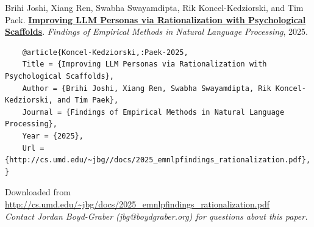 \documentclass[a4paper]{article}
\begin{document}
    Brihi Joshi, Xiang Ren, Swabha Swayamdipta, Rik Koncel-Kedziorski, and Tim Paek.  {\bf \href{http://cs.umd.edu/~jbg//docs/2025_emnlpfindings_rationalization.pdf}{Improving LLM Personas via Rationalization with Psychological Scaffolds}}.  \emph{Findings of Empirical Methods in Natural Language Processing}, 2025.



    \vspace{5cm}

    \begin{verbatim}
    @article{Koncel-Kedziorski,:Paek-2025,
	Title = {Improving LLM Personas via Rationalization with Psychological Scaffolds},
	Author = {Brihi Joshi, Xiang Ren, Swabha Swayamdipta, Rik Koncel-Kedziorski, and Tim Paek},
	Journal = {Findings of Empirical Methods in Natural Language Processing},
	Year = {2025},
	Url = {http://cs.umd.edu/~jbg//docs/2025_emnlpfindings_rationalization.pdf},
}

    \end{verbatim}

    

    

    

    \vspace{3cm}
    Downloaded from \url{http://cs.umd.edu/~jbg/docs/2025_emnlpfindings_rationalization.pdf}  \\

    \vspace{2cm}
    \textit{Contact Jordan Boyd-Graber (jbg@boydgraber.org) for questions about this paper.}

    

    
\end{document}
